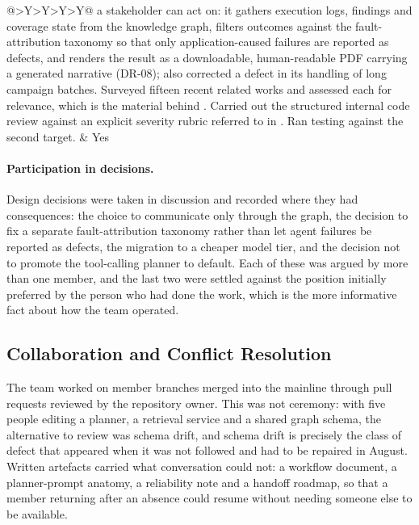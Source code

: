 \begin{xltabular}{\textwidth}{@{}>{\hsize}Y>{\hsize}Y>{\hsize}Y>{\hsize}Y@{}}
    a stakeholder can act on: it gathers execution logs, findings and coverage
    state from the knowledge graph, filters outcomes against the
    fault-attribution taxonomy so that only application-caused failures are
    reported as defects, and renders the result as a downloadable,
    human-readable PDF carrying a generated narrative (DR-08); also corrected
    a defect in its handling of long campaign batches. Surveyed fifteen recent
    related works and assessed each for relevance, which is the material
    behind . Carried out the structured internal code
    review against an explicit severity rubric referred to in
    . Ran testing against the second target. &
    Yes \\
\end{xltabular}
\endgroup

\paragraph{Participation in decisions.} Design decisions were taken in
discussion and recorded where they had consequences: the choice to communicate
only through the graph, the decision to fix a separate fault-attribution
taxonomy rather than let agent failures be reported as defects, the migration
to a cheaper model tier, and the decision not to promote the tool-calling
planner to default. Each of these was argued by more than one member, and the
last two were settled against the position initially preferred by the person
who had done the work, which is the more informative fact about how the team
operated.


\subsection{Collaboration and Conflict Resolution}
\label{sec:collaboration}

The team worked on member branches merged into the mainline through pull
requests reviewed by the repository owner. This was not ceremony: with five
people editing a planner, a retrieval service and a shared graph schema, the
alternative to review was schema drift, and schema drift is precisely the class
of defect that appeared when it was not followed and had to be repaired in
August. Written artefacts carried what conversation could not: a workflow
document, a planner-prompt anatomy, a reliability note and a handoff roadmap,
so that a member returning after an absence could resume without needing
someone else to be available.


